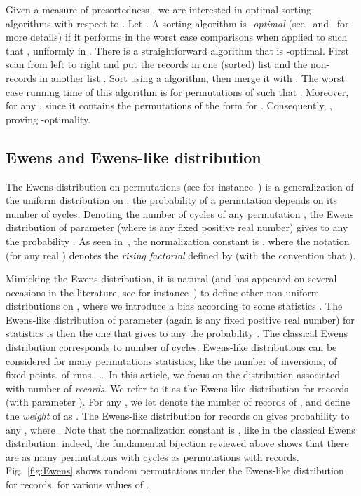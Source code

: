 \documentclass[proceedings]{aofa}
\begin{document}
Given a measure of presortedness , we are interested in optimal sorting algorithms with respect to . 
Let . 
A sorting algorithm is \emph{-optimal} (see~\cite{Mannila1985} and~\cite{Petersson95} for more details) 
if it performs in the worst case  comparisons when applied to  such that , uniformly in . 
There is a straightforward algorithm  that is -optimal. First scan  from left to right and put the records in one (sorted) list  and the non-records in another list . Sort  using a  algorithm, then merge it with
. The worst case running time of this algorithm is  for 
permutations  of  such that .
Moreover,  for any , 
since it contains the  permutations of the form  for . 
Consequently, , proving -optimality. 

\subsection{Ewens and Ewens-like distribution}

The Ewens distribution on permutations (see for instance~\cite[Ch. 4 \& 5]{Arratia}) is a generalization of the uniform distribution on : 
the probability of a permutation depends on its number of cycles. 
Denoting  the number of cycles of any permutation , 
the Ewens distribution of parameter  (where  is any fixed positive real number) 
gives to any  the probability . 
As seen in~\cite[Ch. 5]{Arratia}, the normalization constant  is , 
where the notation  (for any real ) denotes the \emph{rising factorial} defined by
 (with the convention that ).

Mimicking the Ewens distribution, it is natural (and has appeared on several occasions in the literature, see for instance~\cite[Example 12]{Borodin}) 
to define other non-uniform distributions on , 
where we introduce a bias according to some statistics . 
The Ewens-like distribution of parameter  (again  is any fixed positive real number) 
for statistics  
is then the one that gives to any  the probability . 
The classical Ewens distribution corresponds to  number of cycles. 
Ewens-like distributions can be considered for many permutations statistics, like the number of inversions, of fixed points, of runs,~\dots 
In this article, we focus on the distribution associated with  number of \emph{records}. 
We refer to it as the Ewens-like distribution for records (with parameter ).
For any , we let  denote the number of records of , and define the \emph{weight} of  as . 
The Ewens-like distribution for records on  gives probability  to any , 
where . 
Note that the normalization constant is , like in the classical Ewens distribution: 
indeed, the fundamental bijection reviewed above 
shows that there are as many permutations with  cycles as permutations with  records. 
Fig.~\ref{fig:Ewens} shows random permutations under the Ewens-like distribution for records, for various values of . 
\end{document}

